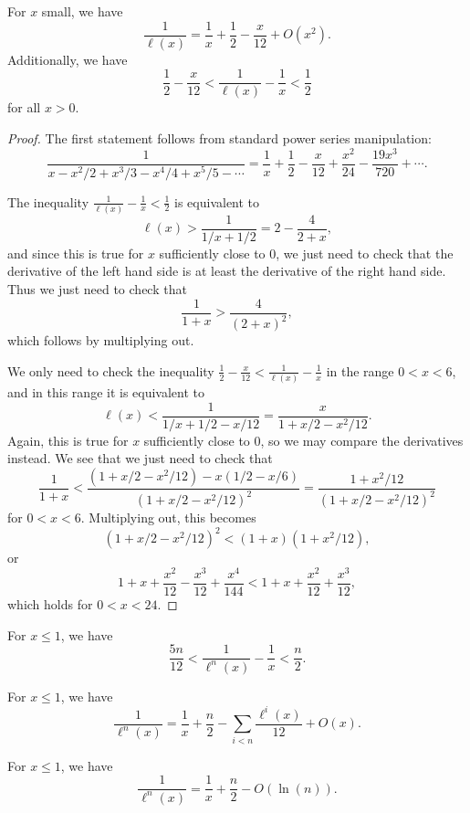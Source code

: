 \documentclass[letterpaper,11pt]{article}
\begin{document}
\begin{prop} For $x$ small, we have
\[
\frac{1}{\ell(x)} = \frac{1}{x} + \frac{1}{2} - \frac{x}{12} + O(x^2).
\]
Additionally, we have
\[
\frac{1}{2} - \frac{x}{12} < \frac{1}{\ell(x)} - \frac{1}{x} < \frac{1}{2}
\]
for all $x > 0$.
\end{prop}
\begin{proof} The first statement follows from standard power series manipulation:
\[
\frac{1}{x - x^2/2 + x^3/3 - x^4/4 + x^5/5 - \cdots} = \frac{1}{x} + \frac{1}{2} - \frac{x}{12} + \frac{x^2}{24} - \frac{19x^3}{720} + \cdots.
\]

The inequality $\frac{1}{\ell(x)} - \frac{1}{x} < \frac{1}{2}$ is equivalent to
\[
\ell(x) > \frac{1}{1/x + 1/2} = 2 - \frac{4}{2+x},
\]
and since this is true for $x$ sufficiently close to $0$, we just need to check that the derivative of the left hand side is at least the derivative of the right hand side. Thus we just need to check that
\[
\frac{1}{1+x} > \frac{4}{(2+x)^2},
\]
which follows by multiplying out.

We only need to check the inequality $\frac{1}{2} - \frac{x}{12} < \frac{1}{\ell(x)} - \frac{1}{x}$ in the range $0 < x < 6$, and in this range it is equivalent to
\[
\ell(x) < \frac{1}{1/x + 1/2 - x/12} = \frac{x}{1 + x/2 - x^2/12}.
\]
Again, this is true for $x$ sufficiently close to $0$, so we may compare the derivatives instead. We see that we just need to check that
\[
\frac{1}{1+x} < \frac{(1 + x/2 - x^2/12) - x(1/2 - x/6)}{(1 + x/2 - x^2/12)^2} = \frac{1 + x^2/12}{(1 + x/2 - x^2/12)^2}
\]
for $0 < x < 6$. Multiplying out, this becomes
\[
(1 + x/2 - x^2/12)^2 < (1+x)(1 + x^2/12),
\]
or
\[
1 + x + \frac{x^2}{12} - \frac{x^3}{12} + \frac{x^4}{144} < 1 + x + \frac{x^2}{12} + \frac{x^3}{12},
\]
which holds for $0 < x < 24$.
\end{proof}

\begin{cor} For $x \le 1$, we have
\[
\frac{5n}{12} < \frac{1}{\ell^n(x)} - \frac{1}{x} < \frac{n}{2}.
\]
\end{cor}

\begin{cor} For $x \le 1$, we have
\[
\frac{1}{\ell^n(x)} = \frac{1}{x} + \frac{n}{2} - \sum_{i < n} \frac{\ell^i(x)}{12} + O(x).
\]
\end{cor}

\begin{cor} For $x \le 1$, we have
\[
\frac{1}{\ell^n(x)} = \frac{1}{x} + \frac{n}{2} - O(\ln(n)).
\]
\end{cor}
\end{document}
